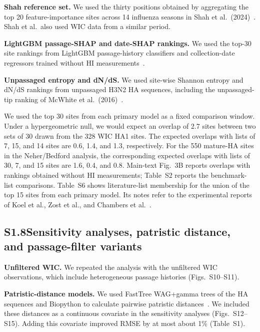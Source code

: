 \documentclass[12pt]{article}
\begin{document}
\textbf{Shah reference set.} We used the thirty positions obtained by aggregating the top 20 feature-importance sites across 14 influenza seasons in Shah et al.\ (2024)~\cite{shah2024seasonal}. Shah et al.\ also used WIC data from a similar period.

\textbf{LightGBM passage-SHAP and date-SHAP rankings.} We used the top-30 site rankings from LightGBM passage-history classifiers and collection-date regressors trained without HI measurements~\cite{Meyer2026Interface_sequenceML}.

\textbf{Unpassaged entropy and dN/dS.} We used site-wise Shannon entropy and dN/dS rankings from unpassaged H3N2 HA sequences, including the unpassaged-tip ranking of McWhite et al.\ (2016)~\cite{McWhite2016VE_passage}.

We used the top 30 sites from each primary model as a fixed comparison window. Under a hypergeometric null, we would expect an overlap of 2.7 sites between two sets of 30 drawn from the 328 WIC HA1 sites. The expected overlaps with lists of 7, 15, and 14 sites are 0.6, 1.4, and 1.3, respectively. For the 550 mature-HA sites in the Neher/Bedford analysis, the corresponding expected overlaps with lists of 30, 7, and 15 sites are 1.6, 0.4, and 0.8. Main-text Fig.~3B reports overlaps with rankings obtained without HI measurements; Table~S2 reports the benchmark-list comparisons. Table~S6 shows literature-list membership for the union of the top 15 sites from each primary model. Its notes refer to the experimental reports of Koel et al., Zost et al., and Chambers et al.~\cite{Koel2019JGenVirol, Zost2017PNAS, Chambers2015CellReports}.

\subsection*{S1.8\quad Sensitivity analyses, patristic distance,\\ and passage-filter variants}

\textbf{Unfiltered WIC.} We repeated the analysis with the unfiltered WIC observations, which include heterogeneous passage histories (Figs.~S10--S11).

\textbf{Patristic-distance models.} We used FastTree WAG+gamma trees of the HA sequences and Biopython to calculate pairwise patristic distances~\cite{Price2010PLoSOne, cock2009biopython}. We included these distances as a continuous covariate in the sensitivity analyses (Figs.~S12--S15). Adding this covariate improved RMSE by at most about 1\% (Table~S1).
\end{document}
